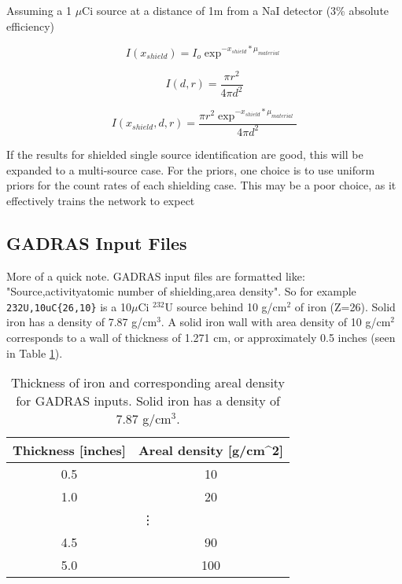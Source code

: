\documentclass[thesis,tocnosub,noragright,centerchapter,12pt,fullpage]{uiucecethesis09}
\begin{document}
Assuming a 1 $\mu$Ci source at a distance of 1m from a NaI detector (3\% absolute efficiency)  

\begin{equation} \label{attenuation_equation}
I(x_{shield}) = I_o \exp^{-x_{shield}*\mu_{material}}
\end{equation}

\begin{equation} \label{geometric_eff}
I(d,r) = \frac{\pi r^2}{4 \pi d^2}
\end{equation}

\begin{equation} \label{total_eff}
I(x_{shield},d,r) = \frac{\pi r^2 \exp^{-x_{shield}*\mu_{material}} }{4 \pi d^2}
\end{equation}




If the results for shielded single source identification are good, this will be expanded to a multi-source case. For the priors, one choice is to use uniform priors for the count rates of each shielding case. This may be a poor choice, as it effectively trains the network to expect 

\subsection{GADRAS Input Files}

More of a quick note. GADRAS input files are formatted like: "Source,activity{atomic number of shielding,area density}". So for example \verb!232U,10uC{26,10}! is a 10$\mu$Ci $^{232}$U source behind 10 g/cm$^{2}$ of iron (Z=26).  Solid iron has a density of 7.87 g/cm$^{3}$. A solid iron wall with area density of 10 g/cm$^{2}$ corresponds to a wall of thickness of 1.271 cm, or approximately 0.5 inches (seen in Table \ref{Irontable}).


\begin{table}[]
\centering
\caption{Thickness of iron and corresponding areal density for GADRAS inputs. Solid iron has a density of 7.87 g/cm$^{3}$.}
\label{Irontable}
\begin{tabular}{|c|c|}
\hline
Thickness {[}inches{]} & Areal density {[}g/cm\textasciicircum 2{]} \\ \hline
0.5 & 10 \\ \hline
1.0 & 20 \\ \hline
\multicolumn{2}{c}{\vdots} \\ \hline
4.5 & 90 \\ \hline
5.0 & 100 \\ \hline
\end{tabular}
\end{table}
\end{document}
